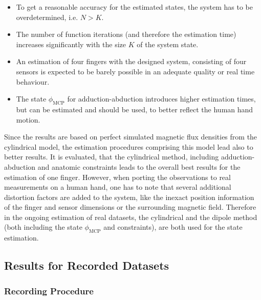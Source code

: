 \begin{itemize}
\item To get a reasonable accuracy for the estimated states, the system has to be overdetermined, i.e. $ N > K $.
\item The number of function iterations (and therefore the estimation time) increases significantly with the size $ K $ of the system state.
\item An estimation of four fingers with the designed system, consisting of four sensors is expected to be barely possible in an adequate quality or real time behaviour.
\item The state $ \phi_{\mathrm{MCP}} $ for adduction-abduction introduces higher estimation times, but can be estimated and should be used, to better reflect the human hand motion.
\end{itemize}
Since the results are based on perfect simulated magnetic flux densities from the cylindrical model, the estimation procedures comprising this model lead also to better results. It is evaluated, that the cylindrical method, including adduction-abduction and anatomic constraints leads to the overall best results for the estimation of one finger. However, when porting the observations to real measurements on a human hand, one has to note that several additional distortion factors are added to the system, like the inexact position information of the finger and sensor dimensions or the surrounding magnetic field. Therefore in the ongoing estimation of real datasets, the cylindrical and the dipole method (both including the state $ \phi_{\mathrm{MCP}} $ and constraints), are both used for the state estimation.

\FloatBarrier
\subsection{Results for Recorded Datasets} \label{subsec:resMeas}

\subsubsection{Recording Procedure}\label{subsubsec:recSetup}

